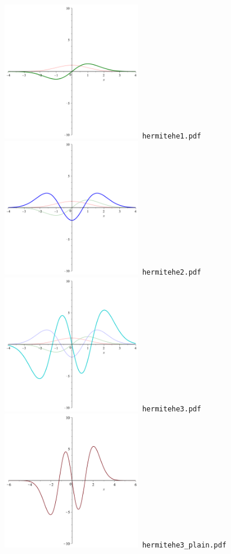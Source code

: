 \documentclass[a4paper]{amsart}
\begin{document}
\includegraphics[width=6cm]{hermitehe1.pdf}\verb+ hermitehe1.pdf+\\
\includegraphics[width=6cm]{hermitehe2.pdf}\verb+ hermitehe2.pdf+\\
\includegraphics[width=6cm]{hermitehe3.pdf}\verb+ hermitehe3.pdf+\\
\includegraphics[width=6cm]{hermitehe3_plain.pdf}\verb+ hermitehe3_plain.pdf+\\
\end{document}
